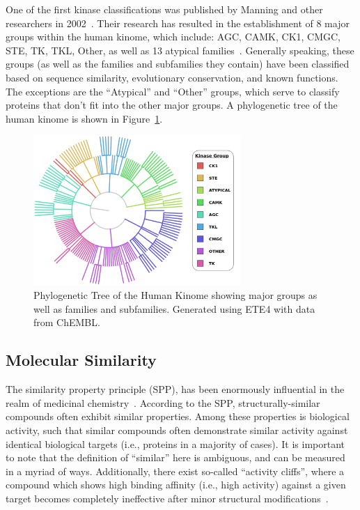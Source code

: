 \documentclass[11pt]{article}
\begin{document}
One of the first kinase classifications was published by Manning and other researchers in 2002~\cite{manning_2002}. 
Their research has resulted in the establishment of 8 major groups within the human kinome, which include: AGC, CAMK, CK1, CMGC, STE, TK, TKL, Other, as well as 13 atypical families~\cite{eid_turk_volkamer_rippmann_fulle_2017}.
Generally speaking, these groups (as well as the families and subfamilies they contain) have been classified based on sequence similarity, evolutionary conservation, and known functions. The exceptions are the ``Atypical'' and ``Other'' groups, which serve to classify proteins that don't fit into the other major groups. 
A phylogenetic tree of the human kinome is shown in Figure~\ref{fig:fam_tree}. %

\begin{figure}[H]
    \centering
    \includegraphics[width=0.7\textwidth]{../figures/protein_family_tree.png}
    \caption{Phylogenetic Tree of the Human Kinome showing major groups as well as families and subfamilies. Generated using ETE4 with data from ChEMBL.}
    \label{fig:fam_tree}
\end{figure}


\subsection{Molecular Similarity}
The similarity property principle (SPP), has been enormously influential in the realm of medicinal chemistry~\cite{maggiora_vogt_stumpfe_bajorath_2013}. 
According to the SPP, structurally-similar compounds often exhibit similar properties. 
Among these properties is biological activity, such that similar compounds often demonstrate similar activity against identical biological targets (i.e., proteins in a majority of cases). 
It is important to note that the definition of ``similar'' here is ambiguous, and can be measured in a myriad of ways. 
Additionally, there exist so-called ``activity cliffs'', where a compound which shows high binding affinity (i.e., high activity) against a given target becomes completely ineffective after minor structural modifications~\cite{maggiora_vogt_stumpfe_bajorath_2013,filip_miljkovic_jurgen_bajorath_2018}. 
\end{document}
